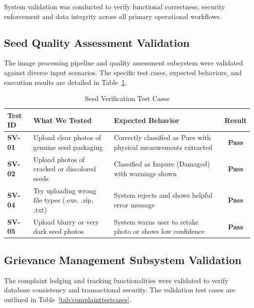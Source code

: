 System validation was conducted to verify functional correctness, security enforcement and data integrity across all primary operational workflows.

\subsection{Seed Quality Assessment Validation}

The image processing pipeline and quality assessment subsystem were validated against diverse input scenarios. The specific test cases, expected behaviors, and execution results are detailed in Table~\ref{tab:seedtestcases}.

\begin{table}[htbp]
  \centering
  \caption{Seed Verification Test Cases}
  \label{tab:seedtestcases}
  \small
  \renewcommand{\arraystretch}{1.1}
  \begin{tabularx}{\textwidth}{|p{1.6cm}|X|X|c|}
    \hline
    \textbf{Test ID} & \textbf{What We Tested} & \textbf{Expected Behavior} & \textbf{Result} \\
    \hline
    \textbf{SV-01} & Upload clear photos of genuine seed packaging & Correctly classified as Pure with physical measurements extracted & \textbf{Pass} \\
    \hline
    \textbf{SV-02} & Upload photos of cracked or discolored seeds & Classified as Impure (Damaged) with warnings shown & \textbf{Pass} \\
    \hline
    \textbf{SV-04} & Try uploading wrong file types (.exe, .zip, .txt) & System rejects and shows helpful error message & \textbf{Pass} \\
    \hline
    \textbf{SV-05} & Upload blurry or very dark seed photos & System warns user to retake photo or shows low confidence & \textbf{Pass} \\
    \hline
  \end{tabularx}
\end{table}

\subsection{Grievance Management Subsystem Validation}

The complaint lodging and tracking functionalities were validated to verify database consistency and transactional security. The validation test cases are outlined in Table~\ref{tab:complainttestcases}.

